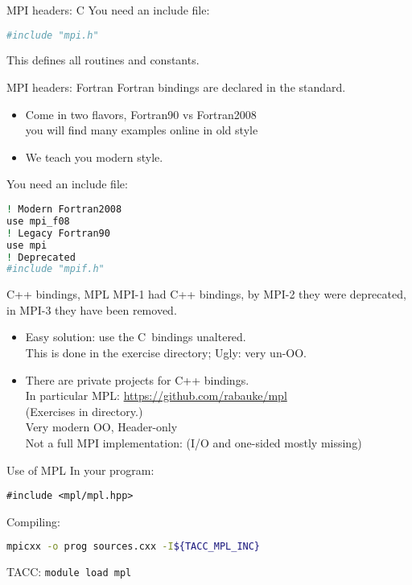 \begin{numberedframe}{MPI headers: C}
\label{sl:mpi-header-c}
You need an include file:
\begin{lstlisting}[language=bash]
#include "mpi.h"
\end{lstlisting}
This defines all routines and constants.
\end{numberedframe}

\begin{fortran}
  \addtocounter{slidecount}{-1}
\begin{numberedframe}{MPI headers: Fortran}
    \label{sl:mpi-header-f}
    Fortran bindings are declared in the standard.
    \begin{itemize}
    \item Come in two flavors, Fortran90 vs Fortran2008\\
      you will find many examples online in old style
    \item We teach you modern style.
    \end{itemize}
    You need an include file:
\begin{lstlisting}[language=bash]
! Modern Fortran2008
use mpi_f08
! Legacy Fortran90
use mpi       
! Deprecated
#include "mpif.h"
\end{lstlisting}
\end{numberedframe}
\end{fortran}

\begin{mpl}
  \addtocounter{slidecount}{-1}
\begin{numberedframe}{C++ bindings, MPL}
  MPI-1 had C++ bindings, by MPI-2 they were deprecated, in MPI-3 they have been removed.
  \begin{itemize}
  \item Easy solution: use the C~bindings unaltered.\\
    This is done in the  exercise directory;  Ugly: very un-OO.
  \item There are private projects for C++ bindings.\\
    In particular
    MPL: \url{https://github.com/rabauke/mpl}\\
    (Exercises in  directory.)\\
    Very modern OO,  Header-only\\
    Not a full MPI implementation: (I/O and one-sided mostly missing)
  \end{itemize}
\end{numberedframe}
\begin{numberedframe}{Use of MPL}
    In your program:
\begin{lstlisting}[numbers=none]
#include <mpl/mpl.hpp>
\end{lstlisting}
    Compiling:
\begin{lstlisting}[language=bash,numbers=none]
mpicxx -o prog sources.cxx -I${TACC_MPL_INC}
\end{lstlisting}
TACC: \texttt{module load mpl}
\end{numberedframe}
\end{mpl}

